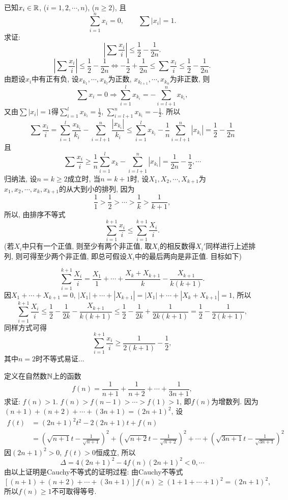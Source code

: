 \bq{}{}
已知$x_{i}\in\mathbb{R}$, ($i=1,2,\cdots,n$), ($n\ge2$), 且
\[
\sum_{i=1}^{n}x_{i}=0,\qquad\sum\left|x_{i}\right|=1.
\]
求证:
\[
\left|\sum\frac{x_{i}}{i}\right|\le\frac{1}{2}-\frac{1}{2n}.
\]
\eq
\ba
\[
\left|\sum\frac{x_{i}}{i}\right|\le\frac{1}{2}-\frac{1}{2n}\Longleftrightarrow-\frac{1}{2}+\frac{1}{2n}\le\sum\frac{x_{i}}{i}\le\frac{1}{2}-\frac{1}{2n}.
\]
由题设$x_{i}$中有正有负, 设$x_{k_{1}},\cdots,x_{k_{l}}$为正数, $x_{k_{l+1}},\cdots,x_{k_{n}}$为非正数,
则
\[
\sum x_{i}=0\Longrightarrow\sum_{i=1}^{l}x_{k_{i}}=-\sum_{i=l+1}^{n}x_{k_{i}},
\]
又由$\sum\left|x_{i}\right|=1$得$\sum_{i=1}^{l}x_{k_{i}}=\frac{1}{2}$,
$\sum_{i=l+1}^{n}x_{k_{i}}=-\frac{1}{2}$. 所以
\[
\sum\frac{x_{i}}{i}=\sum_{i=1}^{l}\frac{x_{k_{i}}}{k_{i}}-\sum_{i=l+1}^{n}\frac{\left|x_{k_{i}}\right|}{k_{i}}\le\sum_{i=1}^{l}x_{k_{i}}-\frac{1}{n}\sum_{i=l+1}^{n}\left|x_{k_{i}}\right|=\frac{1}{2}-\frac{1}{2n}
\]
且
\[
\sum\frac{x_{i}}{i}\ge\frac{1}{n}\sum_{i=1}^{l}x_{k}-\sum_{i=l+1}^{n}\left|x_{k_{i}}\right|=\frac{1}{2n}-\frac{1}{2},\cdots
\]
\ea
\ba
归纳法, 设$n=k\ge2$成立时, 当$n=k+1$时, 设$X_{1},X_{2},\cdots,X_{k+1}$为$x_{1},x_{2},\cdots,x_{k},x_{k+1}$的从大到小的排列,
因为
\[
\frac{1}{1}>\frac{1}{2}>\cdots>\frac{1}{k}>\frac{1}{k+1},
\]
所以, 由排序不等式
\[
\sum_{i=1}^{k+1}\frac{x_{i}}{i}\le\sum_{i=1}^{k+1}\frac{X_{i}}{i}.
\]
(若$X_{i}$中只有一个正值, 则至少有两个非正值, 取$X_{i}$的相反数得$X_{i}'$同样进行上述排列, 则可得至少两个非正值, 
即总可假设$X_{i}$中的最后两向是非正值. 目标如下)

\[
\sum_{i=1}^{k+1}\frac{X_{i}}{i}=\frac{X_{1}}{1}+\cdots+\frac{X_{k}+X_{k+1}}{k}-\frac{X_{k+1}}{k\left(k+1\right)}.
\]
因$X_{1}+\cdots+X_{k+1}=0$, $\left|X_{1}\right|+\cdots+\left|X_{k+1}\right|=\left|X_{1}\right|+\cdots+\left|X_{k}+X_{k+1}\right|=1$,
所以
\[
\sum_{i=1}^{k+1}\frac{X_{i}}{i}\le\frac{1}{2}-\frac{1}{2k}-\frac{X_{k+1}}{k\left(k+1\right)}\le\frac{1}{2}-\frac{1}{2k}+\frac{1}{2k\left(k+1\right)}=\frac{1}{2}-\frac{1}{2\left(k+1\right)},
\]
同样方式可得
\[
\sum_{i=1}^{k+1}\frac{x_{i}}{i}\ge\frac{1}{2\left(k+1\right)}-\frac{1}{2},
\]
其中$n=2$时不等式易证...
\ea

\bq{}{}
定义在自然数$\mathbb{N}$上的函数
\[
f\left(n\right)=\frac{1}{n+1}+\frac{1}{n+2}+\cdots+\frac{1}{3n+1},
\]
求证: $f\left(n\right)>1$.
\eq
\ba
$f\left(n\right)>f\left(n-1\right)>\cdots>f\left(1\right)>1$,
即$f\left(n\right)$为增数列.
\ea
\ba
因为$\left(n+1\right)+\left(n+2\right)+\cdots+\left(3n+1\right)=\left(2n+1\right)^{2}$,
设
\[
\begin{aligned}f\left(t\right) & =\left(2n+1\right)^{2}t^{2}-2\left(2n+1\right)t+f\left(n\right)\\
 & =\left(\sqrt{n+1}t-\frac{1}{\sqrt{n+1}}\right)^{2}+\left(\sqrt{n+2}t-\frac{1}{\sqrt{n+2}}\right)^{2}+\cdots+\left(\sqrt{3n+1}t-\frac{1}{\sqrt{3n+1}}\right)^{2}
\end{aligned}
\]
因$\left(2n+1\right)^{2}>0$, $f\left(t\right)>0$恒成立, 所以
\[
\Delta=4\left(2n+1\right)^{2}-4f\left(n\right)\left(2n+1\right)^{2}<0,\cdots
\]
\ea
\ba
由以上证明是Cauchy不等式的证明过程: 由Cauchy不等式
\[
\left[\left(n+1\right)+\left(n+2\right)+\cdots+\left(3n+1\right)\right]f\left(n\right)\ge\left(1+1+\cdots+1\right)^{2}=\left(2n+1\right)^{2},
\]
所以$f\left(n\right)\ge1$不可取得等号.
\ea

